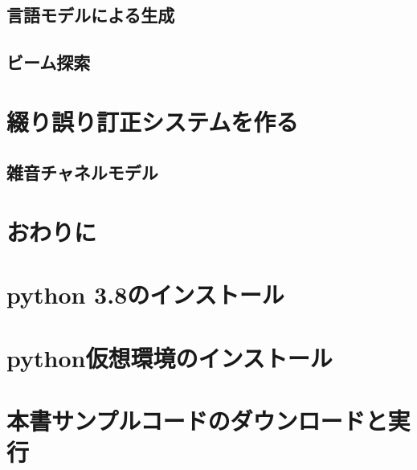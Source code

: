 \documentclass[11pt]{report}
\begin{document}
\section{言語モデルによる生成}

\section{ビーム探索}

\chapter{綴り誤り訂正システムを作る}

\section{雑音チャネルモデル}

\chapter{おわりに}

\appendix
\def\thesection{補遺\Alph{section}}

\chapter{python 3.8のインストール}

\chapter{python仮想環境のインストール}

\chapter{本書サンプルコードのダウンロードと実行}
\end{document}
